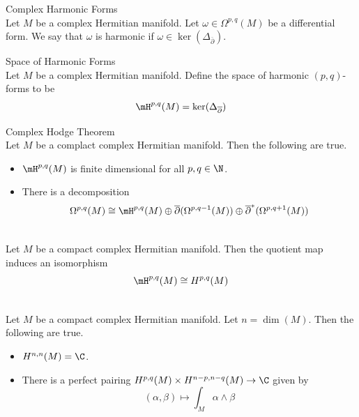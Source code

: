 \documentclass[a4paper]{article}
\begin{document}
\begin{defn}{Complex Harmonic Forms}{}\\
Let $M$ be a complex Hermitian manifold. Let $\omega\in\Omega^{p,q}(M)$ be a differential form. We say that $\omega$ is harmonic if $\omega\in\ker(\Delta_{\overline{\partial}})$. 
\end{defn}

\begin{defn}{Space of Harmonic Forms}{}\\
Let $M$ be a complex Hermitian manifold. Define the space of harmonic $(p,q)$-forms to be $$\mH^{p,q}(M)=\ker(\Delta_{\overline{\partial}})$$
\end{defn}

\begin{thm}{Complex Hodge Theorem}{}\\
Let $M$ be a complact complex Hermitian manifold. Then the following are true. 
\begin{itemize}
\item $\mH^{p,q}(M)$ is finite dimensional for all $p,q\in\N$. 
\item There is a decomposition $$\Omega^{p,q}(M)\cong\mH^{p,q}(M)\oplus\overline{\partial}(\Omega^{p,q-1}(M))\oplus\overline{\partial}^\ast(\Omega^{p,q+1}(M))$$
\end{itemize}
\end{thm}

\begin{crl}{}{}\\
Let $M$ be a compact complex Hermitian manifold. Then the quotient map induces an isomorphism $$\mH^{p,q}(M)\cong H^{p,q}(M)$$
\end{crl}

\begin{prp}{}{}\\
Let $M$ be a compact complex Hermitian manifold. Let $n=\dim(M)$. Then the following are true. 
\begin{itemize}
\item $H^{n,n}(M)=\C$. 
\item There is a perfect pairing $H^{p,q}(M)\times H^{n-p,n-q}(M)\to\C$ given by $$(\alpha,\beta)\mapsto\int_M\alpha\wedge\beta$$
\end{itemize}
\end{prp}
\end{document}
